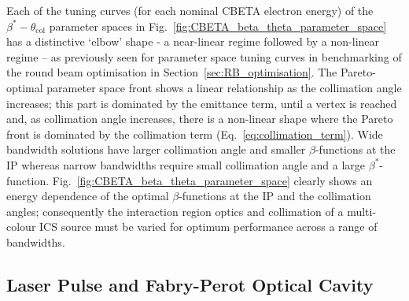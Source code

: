\documentclass[../main.tex]{subfiles}
\begin{document}
Each of the tuning curves (for each nominal CBETA electron energy) of the $\beta^{*}-\theta_{\mathrm{col}}$ parameter spaces in Fig.~\ref{fig:CBETA_beta_theta_parameter_space} has a distinctive `elbow' shape - a near-linear regime followed by a non-linear regime -- as previously seen for parameter space tuning curves in benchmarking of the round beam optimisation in Section~\ref{sec:RB_optimisation}. The Pareto-optimal parameter space front shows a linear relationship as the collimation angle increases; this part is dominated by the emittance term, until a vertex is reached and, as collimation angle increases, there is a non-linear shape where the Pareto front is dominated by the collimation term (Eq.~\ref{eq:collimation_term}). Wide bandwidth solutions have larger collimation angle and smaller $\beta$-functions at the IP whereas narrow bandwidths require small collimation angle and a large $\beta^{*}$-function. Fig.~\ref{fig:CBETA_beta_theta_parameter_space} clearly shows an energy dependence of the optimal $\beta$-functions at the IP and the collimation angles; consequently the interaction region optics and collimation of a multi-colour ICS source must be varied for optimum performance across a range of bandwidths. 

\subsection{Laser Pulse and Fabry-Perot Optical Cavity}
\label{sec:CBETA_laser_parameters}
\end{document}
